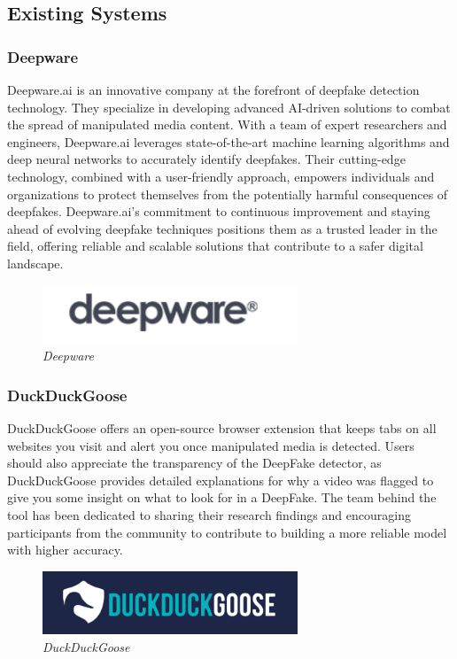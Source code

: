 \subsection{Existing Systems}
\subsubsection{Deepware}
Deepware.ai is an innovative company at the forefront of deepfake detection technology. They specialize in developing advanced AI-driven solutions to combat the spread of manipulated media content. With a team of expert researchers and engineers, Deepware.ai leverages state-of-the-art machine learning algorithms and deep neural networks to accurately identify deepfakes. Their cutting-edge technology, combined with a user-friendly approach, empowers individuals and organizations to protect themselves from the potentially harmful consequences of deepfakes. Deepware.ai's commitment to continuous improvement and staying ahead of evolving deepfake techniques positions them as a trusted leader in the field, offering reliable and scalable solutions that contribute to a safer digital landscape.
\begin{figure}[h]
    \centering
    \includegraphics[width= 3in ]{img/deepware.png}
    \caption{\textit{Deepware}}
\end{figure}
\subsubsection{DuckDuckGoose}
\justify
DuckDuckGoose offers an open-source browser extension that keeps tabs on all websites you visit and alert you once manipulated media is detected.
Users should also appreciate the transparency of the DeepFake detector, as DuckDuckGoose provides detailed explanations for why a video was flagged to give you some insight on what to look for in a DeepFake.
The team behind the tool has been dedicated to sharing their research findings and encouraging participants from the community to contribute to building a more reliable model with higher accuracy.
\begin{figure}[h]
    \centering
    \includegraphics[width= 3in ]{img/duckduckgoose.png}
    \caption{\textit{DuckDuckGoose}}
\end{figure}
\newpage